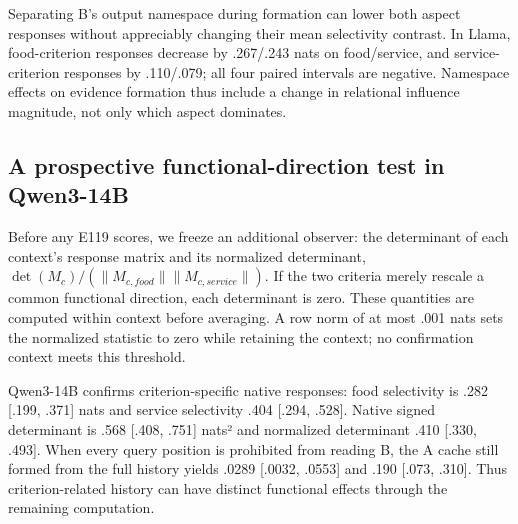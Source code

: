 \documentclass[11pt]{article}
\begin{document}
Separating B's output namespace during formation can lower both aspect responses without appreciably changing their mean selectivity contrast. In Llama, food-criterion responses decrease by .267/.243 nats on food/service, and service-criterion responses by .110/.079; all four paired intervals are negative. Namespace effects on evidence formation thus include a change in relational influence magnitude, not only which aspect dominates.

\subsection{A prospective functional-direction test in Qwen3-14B}\label{a-prospective-functional-direction-test-in-qwen3-14b}

Before any E119 scores, we freeze an additional observer: the determinant of each context's response matrix and its normalized determinant, \(\det(M_c)/(\|M_{c,food}\|\|M_{c,service}\|)\). If the two criteria merely rescale a common functional direction, each determinant is zero. These quantities are computed within context before averaging. A row norm of at most .001 nats sets the normalized statistic to zero while retaining the context; no confirmation context meets this threshold.

Qwen3-14B confirms criterion-specific native responses: food selectivity is .282 {[}.199, .371{]} nats and service selectivity .404 {[}.294, .528{]}. Native signed determinant is .568 {[}.408, .751{]} nats² and normalized determinant .410 {[}.330, .493{]}. When every query position is prohibited from reading B, the A cache still formed from the full history yields .0289 {[}.0032, .0553{]} and .190 {[}.073, .310{]}. Thus criterion-related history can have distinct functional effects through the remaining computation.
\end{document}
